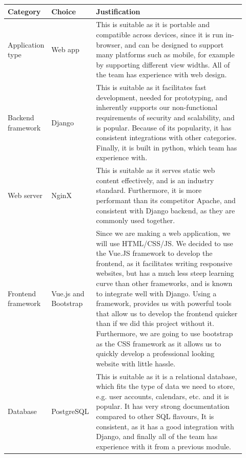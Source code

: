 \documentclass[10pt]{article}
\begin{document}
\begin{longtable}{|p{0.085\linewidth}|p{0.09\linewidth}|p{0.75\linewidth}|}
    \hline \textbf{Category} & \textbf{Choice} & \textbf{Justification} \\ \hline\hline


    Application type
    &
    Web app
    &
    This is suitable as it is portable and compatible across devices, since it
    is run in-browser, and can be designed to support many platforms such as
    mobile, for example by supporting different view widths. All of the team
    has experience with web design.
    \\ \hline

    Backend framework
    &
    Django \cite{Django}
    &
    This is suitable as it facilitates fast development, needed for prototyping,
    and inherently supports our non-functional requirements of security and
    scalability, and is popular. Because of its popularity, it has consistent
    integrations with other categories. Finally, it is built in python, which
    team has experience with.
    \\ \hline

    Web server
    &
    NginX \cite{NginX}
    &
    This is suitable as it serves static web content effectively, and is an
    industry standard. Furthermore, it is more performant than its competitor
    Apache, and consistent with Django backend, as they are commonly used
    together.
    \\ \hline

    Frontend framework
    &
    Vue.js \cite{Vue} and Bootstrap \cite{Bootstrap}
    &
    Since we are making a web application, we will use HTML/CSS/JS. We decided
    to use the Vue.JS framework to develop the frontend, as it facilitates
    writing responsive websites, but has a much less steep learning curve than
    other frameworks, and is known to integrate well with Django. Using a
    framework, provides us with powerful tools that allow us to develop the
    frontend quicker than if we did this project without it. Furthermore, we are
    going to use bootstrap as the CSS framework as it allows us to quickly
    develop a professional looking website with little hassle.
    \\ \hline

    Database
    &
    PostgreSQL \cite{PostgreSQL}
    &
    This is suitable as it is a relational database, which fits the type of data
    we need to store, e.g. user accounts, calendars, etc. and it is popular. It
    has very strong documentation compared to other SQL flavours, It is
    consistent, as it has a good integration with Django, and finally all of the
    team has experience with it from a previous module.
    \\ \hline


\end{longtable}
\end{document}
